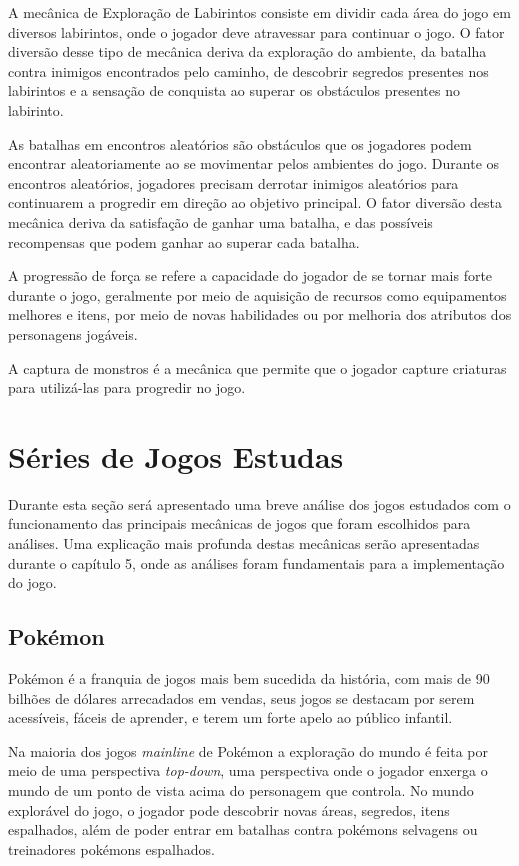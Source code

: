 \documentclass[
	12pt,				%
	openright,			%
	twoside,			%
	a4paper,			%
	english,			%
	french,				%
	spanish,			%
	brazil				%
	]{abntex2}
\begin{document}
	A mecânica de Exploração de Labirintos consiste em dividir cada área do jogo em diversos labirintos, onde o jogador deve atravessar para continuar o jogo. O fator diversão desse tipo de mecânica deriva da exploração do ambiente, da batalha contra inimigos encontrados pelo caminho, de descobrir segredos presentes nos labirintos e a sensação de conquista ao superar os obstáculos presentes no labirinto. 

	As batalhas em encontros aleatórios são obstáculos que os jogadores podem encontrar aleatoriamente ao se movimentar pelos ambientes do jogo. Durante os encontros aleatórios, jogadores precisam derrotar inimigos aleatórios para continuarem a progredir em direção ao objetivo principal. O fator diversão desta mecânica deriva da satisfação de ganhar uma batalha, e das possíveis recompensas que podem ganhar ao superar cada batalha.

	A progressão de força se refere a capacidade do jogador de se tornar mais forte durante o jogo, geralmente por meio de aquisição de recursos como equipamentos melhores e itens, por meio de novas habilidades ou por melhoria dos atributos dos personagens jogáveis. 

	A captura de monstros é a mecânica que permite que o jogador capture criaturas para utilizá-las para progredir no jogo.

\section{Séries de Jogos Estudas}

Durante esta seção será apresentado uma breve análise dos jogos estudados com o funcionamento das principais mecânicas de jogos que foram escolhidos para análises. Uma explicação mais profunda destas mecânicas serão apresentadas durante o capítulo 5, onde as análises foram fundamentais para a implementação do jogo.

\subsection{Pokémon}

Pokémon é a franquia de jogos mais bem sucedida da história, com mais de 90 bilhões de dólares arrecadados em vendas, seus jogos se destacam por serem acessíveis, fáceis de aprender, e terem um forte apelo ao público infantil.

Na maioria dos jogos \emph{mainline} de Pokémon a exploração do mundo é feita por meio de uma perspectiva \emph{top-down}, uma perspectiva onde o jogador enxerga o mundo de um ponto de vista acima do personagem que controla. No mundo explorável do jogo, o jogador pode descobrir novas áreas, segredos, itens espalhados, além de poder entrar em batalhas contra pokémons selvagens ou treinadores pokémons espalhados.
\end{document}
